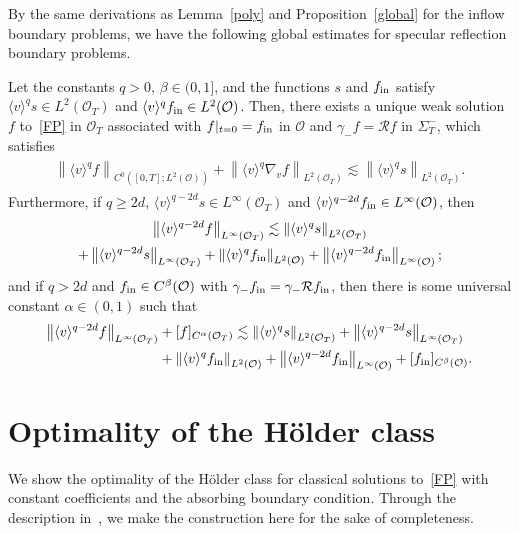 \documentclass[AHL,Unicode,longabstracts,published]{cedram}
\newcommand*\fin {f_{\rm in}}
\newcommand*\RR {\mathcal{R}}
\newcommand*\OO {\mathcal{O}}
\newcommand{\lv}{\langle v\rangle}
\begin{document}
By the same derivations as Lemma~\ref{poly} and Proposition~\ref{global} for the inflow boundary problems, we have the following global estimates for specular reflection boundary problems.

\begin{prop}\label{globals}
Let the constants $q>0$, $\beta\in(0,1]$, and the functions $s$ and $\fin$ satisfy $\lv^qs\in L^2(\OO_T)$ and $\lv^q\fin\in L^2(\OO)$. Then, there exists a unique weak solution $f$ to~\eqref{FP} in $\OO_T$ associated with $f|_{t=0}=\fin$ in $\OO$ and $\gamma_-f=\RR f$ in $\Sigma_T^-$, which satisfies
\begin{align*}
\begin{split}
\left\|\lv^qf\right\|_{C^0\left([0,T];L^2(\OO)\right)} +
\left\|\lv^q\nabla_vf\right\|_{L^2(\OO_T)}
\lesssim \left\|\lv^qs\right\|_{L^2(\OO_T)}.
\end{split}
\end{align*}
Furthermore, if $q\ge 2d$, $\lv^{q-2d}s\in L^\infty(\OO_T)$ and $\lv^{q-2d}\fin\in L^\infty(\OO)$, then
\begin{multline*}
\left\|\lv^{q-2d}f\right\|_{L^\infty(\OO_T)}
\lesssim \left\|\lv^{q}s\right\|_{L^2(\OO_T)} \\
+ \left\|\lv^{q-2d}s\right\|_{L^\infty(\OO_T)}
+ \left\|\lv^{q}\fin\right\|_{L^2(\OO)} + \left\|\lv^{q-2d}\fin\right\|_{L^\infty(\OO)};
\end{multline*}
and if $q>2d$ and $\fin\in C^\beta(\OO)$ with $\gamma_-\fin=\gamma_-\RR\fin$, then there is some universal constant $\alpha\in(0,1)$ such that
\begin{align*}
\left\|\lv^{q-2d}f\right\|_{L^\infty(\OO_T)} &+[f]_{C^\alpha(\OO_T)}
\lesssim \left\|\lv^{q}s\right\|_{L^2(\OO_T)} + \left\|\lv^{q-2d}s\right\|_{L^\infty(\OO_T)} \\
&+\left\|\lv^{q}\fin\right\|_{L^2(\OO)} + \left\|\lv^{q-2d}\fin\right\|_{L^\infty(\OO)} + [\fin]_{C^\beta(\OO)}.
\end{align*}
\end{prop}

\appendix

\section{Optimality of the H\"older class}\label{counterexample}
We show the optimality of the H\"older class for classical solutions to~\eqref{FP} with constant coefficients and the absorbing boundary condition. Through the description in~\cite[Claim~3.7]{HJV}, we make the construction here for the sake of completeness.
\end{document}
